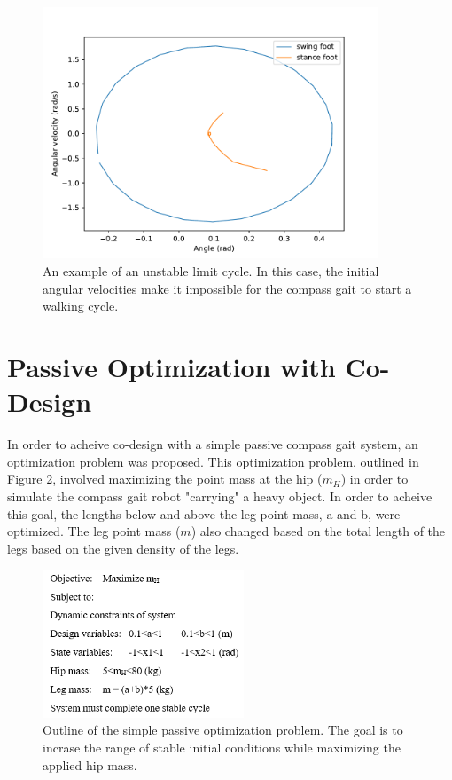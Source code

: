 \documentclass[smallextended]{./springer/svjour3}
\begin{document}
\begin{figure}[!h]
\centering
\includegraphics[width=10cm]{./figures/unstable_onecycle.pdf}
\caption{An example of an unstable limit cycle. In this case, the initial angular velocities make it impossible for the compass gait to start a walking cycle.}
\label{fig:unstable_onecycle}
\end{figure}

\section{Passive Optimization with Co-Design}

In order to acheive co-design with a simple passive compass gait system, an optimization problem was proposed.
This optimization problem, outlined in Figure \ref{fig:optsetup}, involved maximizing the point mass at the hip ($m_H$) in order to simulate the
compass gait robot "carrying" a heavy object. In order to acheive this goal, the lengths below and above the leg point mass, a and b, were optimized.
The leg point mass ($m$) also changed based on the total length of the legs based on the given density of the legs.

\begin{figure}[!h]
\centering
\includegraphics[width=6cm]{./figures/opt1prob.png}
\caption{Outline of the simple passive optimization problem. The goal is to incrase the range of stable initial conditions while maximizing the applied hip mass.}
\label{fig:optsetup}
\end{figure}
\end{document}
